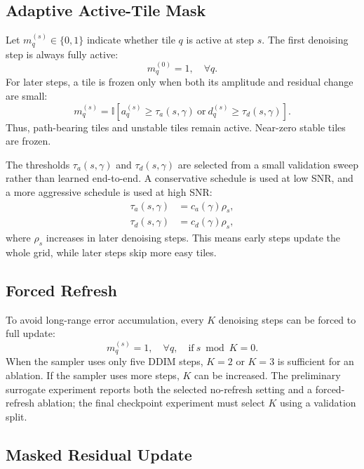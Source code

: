 \documentclass[10pt,journal]{IEEEtran}
\begin{document}
\subsection{Adaptive Active-Tile Mask}

Let $m_q^{(s)}\in\{0,1\}$ indicate whether tile $q$ is active at step $s$.
The first denoising step is always fully active:
\begin{equation}
  m_q^{(0)} = 1,\quad \forall q.
\end{equation}
For later steps, a tile is frozen only when both its amplitude and residual
change are small:
\begin{equation}
  m_q^{(s)}
  =
  \mathbb{I}\left[
  a_q^{(s)} \ge \tau_a(s,\gamma)
  \ \mathrm{or}\
  d_q^{(s)} \ge \tau_d(s,\gamma)
  \right].
  \label{eq:mask_rule}
\end{equation}
Thus, path-bearing tiles and unstable tiles remain active. Near-zero stable
tiles are frozen.

The thresholds $\tau_a(s,\gamma)$ and $\tau_d(s,\gamma)$ are selected from a
small validation sweep rather than learned end-to-end. A conservative schedule
is used at low SNR, and a more aggressive schedule is used at high SNR:
\begin{align}
  \tau_a(s,\gamma) &= c_a(\gamma)\rho_s, \\
  \tau_d(s,\gamma) &= c_d(\gamma)\rho_s,
  \label{eq:threshold_schedule}
\end{align}
where $\rho_s$ increases in later denoising steps. This means early steps
update the whole grid, while later steps skip more easy tiles.

\subsection{Forced Refresh}

To avoid long-range error accumulation, every $K$ denoising steps can be forced
to full update:
\begin{equation}
  m_q^{(s)} = 1,\quad \forall q,\quad \mathrm{if}\ s\bmod K=0.
  \label{eq:forced_refresh}
\end{equation}
When the sampler uses only five DDIM steps, $K=2$ or $K=3$ is sufficient for an
ablation. If the sampler uses more steps, $K$ can be increased. The preliminary
surrogate experiment reports both the selected no-refresh setting and a
forced-refresh ablation; the final checkpoint experiment must select $K$ using a
validation split.

\subsection{Masked Residual Update}
\end{document}
